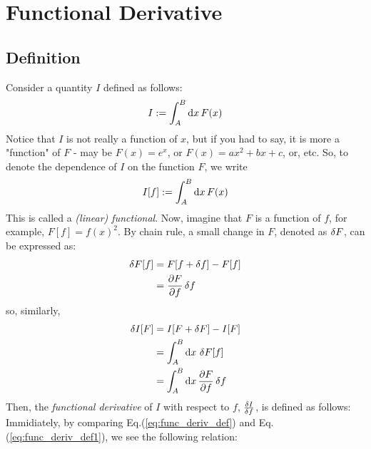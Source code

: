 \section{Functional Derivative}
\subsection{Definition}
Consider a quantity $I$ defined as follows:
\begin{align}
  I := \int_A^B \odif{x} \, F(x)
\end{align}
Notice that $I$ is not really a function of $x$, but if you had to say, it is more a "function" of $F$ - may be $F(x) = e^x$, or $F(x) = a x^2 + bx + c$, or, etc.
So, to denote the dependence of $I$ on the function $F$, we write
\begin{align}
  I[f] := \int_A^B \odif{x} \, F(x)
\end{align}
This is called a \emph{(linear) functional}.
Now, imagine that $F$ is a function of $f$, for example, $F[f] = f(x)^2$.
By chain rule, a small change in $F$, denoted as $\fdif{F}$, can be expressed as:
\begin{align}
  \fdif{F}[f] & = F[f + \fdif{f}] - F[f] \\
              & = \pdv{F}{f} \fdif{f}
\end{align}
so, similarly,
\begin{align}
  \fdif{I}[F] & = I[F + \fdif{F}] - I[F]                                              \\
              & = \int_A^B \odif{x} \, \fdif{F}[f]                                    \\
              & = \int_A^B \odif{x} \, \pdv{F}{f} \fdif{f} \label{eq:func_deriv_def1}
\end{align}
Then, the \emph{functional derivative} of $I$ with respect to $f$, $\fdv{I}{f}$, is defined as follows:
Immidiately, by comparing Eq.(\ref{eq:func_deriv_def}) and Eq.(\ref{eq:func_deriv_def1}), we see the following relation:



